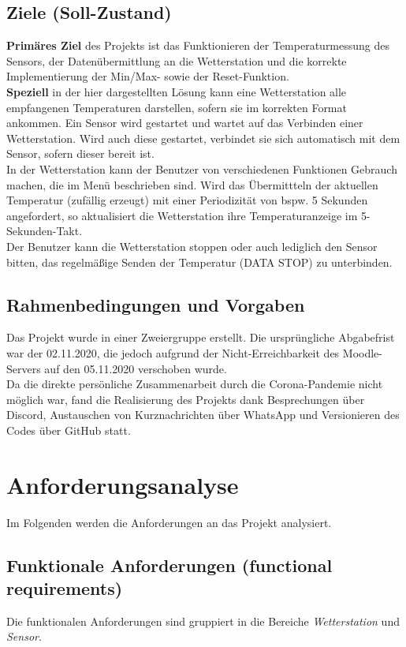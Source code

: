 \documentclass[a4paper]{report}
\begin{document}
\section{Ziele (Soll-Zustand)}
\textbf{Primäres Ziel} des Projekts ist das Funktionieren der Temperaturmessung des Sensors, der Datenübermittlung an die Wetterstation und
die korrekte Implementierung der Min/Max- sowie der Reset-Funktion.\\
\textbf{Speziell} in der hier dargestellten Lösung kann eine Wetterstation
alle empfangenen Temperaturen darstellen, sofern sie im korrekten Format ankommen. Ein Sensor wird gestartet und wartet auf das
Verbinden einer Wetterstation. Wird auch diese gestartet, verbindet sie sich automatisch mit dem Sensor, sofern dieser bereit ist.\\
In der Wetterstation kann der Benutzer von verschiedenen Funktionen Gebrauch machen, die im Menü beschrieben sind.
Wird das Übermittteln der aktuellen Temperatur (zufällig erzeugt) mit einer Periodizität von bspw. 5 Sekunden angefordert, 
so aktualisiert die Wetterstation ihre Temperaturanzeige im 5-Sekunden-Takt.\\
Der Benutzer kann die Wetterstation stoppen oder auch lediglich den Sensor bitten, das regelmäßige Senden der Temperatur (DATA STOP) zu
unterbinden.
\section{Rahmenbedingungen und Vorgaben}
Das Projekt wurde in einer Zweiergruppe erstellt. Die ursprüngliche Abgabefrist war der 02.11.2020, die jedoch aufgrund der
Nicht-Erreichbarkeit des Moodle-Servers auf den 05.11.2020 verschoben wurde.\\
Da die direkte persönliche Zusammenarbeit durch die Corona-Pandemie nicht möglich war, fand die Realisierung des Projekts dank
Besprechungen über Discord, Austauschen von Kurznachrichten über WhatsApp und Versionieren des Codes über GitHub statt.




\chapter{Anforderungsanalyse}
Im Folgenden werden die Anforderungen an das Projekt analysiert.

\section{Funktionale Anforderungen (functional requirements)}
Die funktionalen Anforderungen sind gruppiert in die Bereiche \textit{Wetterstation} und \textit{Sensor}.
\end{document}
